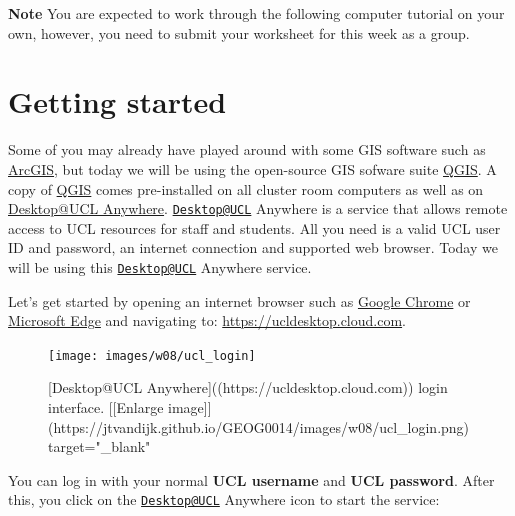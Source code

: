 \documentclass[
]{book}
\begin{document}
\textbf{Note}
You are expected to work through the following computer tutorial on your own, however, you need to submit your worksheet for this week as a group.

\hypertarget{getting-started}{%
\section*{Getting started}\label{getting-started}}

Some of you may already have played around with some GIS software such as \href{https://www.arcgis.com/index.html}{ArcGIS}, but today we will be using the open-source GIS sofware suite \href{https://www.qgis.org/en/site/}{QGIS}. A copy of \href{https://www.qgis.org/en/site/}{QGIS} comes pre-installed on all cluster room computers as well as on \href{https://www.ucl.ac.uk/isd/services/computers/remote-access/desktopucl-anywhere}{Desktop@UCL Anywhere}. \href{mailto:Desktop@UCL}{\nolinkurl{Desktop@UCL}} Anywhere is a service that allows remote access to UCL resources for staff and students. All you need is a valid UCL user ID and password, an internet connection and supported web browser. Today we will be using this \href{mailto:Desktop@UCL}{\nolinkurl{Desktop@UCL}} Anywhere service.

Let's get started by opening an internet browser such as \href{https://www.google.co.uk/chrome/?brand=FHFK\&gclid=Cj0KCQiAip-PBhDVARIsAPP2xc26lB3ONziz2KnCd7Ac1MVjTx66n0Ull4R8oiQqzXzgKnJSqRCwK60aAhmFEALw_wcB\&gclsrc=aw.ds}{Google Chrome} or \href{https://www.microsoft.com/en-us/edge}{Microsoft Edge} and navigating to: \url{https://ucldesktop.cloud.com}.

\begin{figure}

{\centering \texttt{[image: images/w08/ucl\_login]} 

}

\caption{[Desktop@UCL Anywhere]((https://ucldesktop.cloud.com)) login interface. [[Enlarge image]](https://jtvandijk.github.io/GEOG0014/images/w08/ucl_login.png){target="_blank"}}\label{fig:ucl-desktop-login}
\end{figure}

You can log in with your normal \textbf{UCL username} and \textbf{UCL password}. After this, you click on the \href{mailto:Desktop@UCL}{\nolinkurl{Desktop@UCL}} Anywhere icon to start the service:
\end{document}
